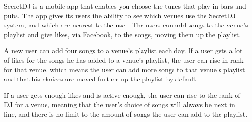 SecretDJ \cite{secretDJ} is a mobile app that enables you choose the tunes that play in bars and pubs. The app gives its users the ability to see which venues use the SecretDJ system, and which are nearest to the user. The users can add songs to the venue's playlist and give likes, via Facebook, to the songs, moving them up the playlist.

A new user can add four songs to a venue's playlist each day. If a user gets a lot of likes for the songs he has added to a venue's playlist, the user can rise in rank for that venue, which means the user can add more songs to that venue's playlist and that his choices are moved further up the playlist by default.

If a user gets enough likes and is active enough, the user can rise to the rank of DJ for a venue, meaning that the user's choice of songs will always be next in line, and there is no limit to the amount of songs the user can add to the playlist.
